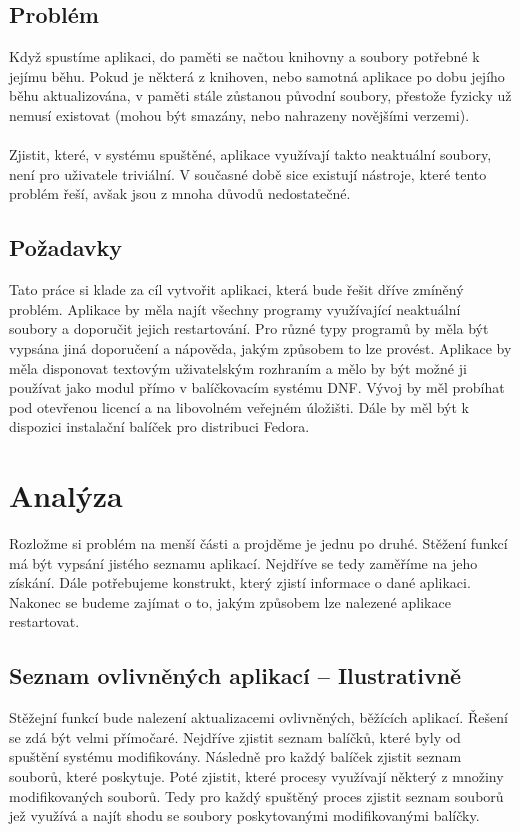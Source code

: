 \documentclass[10pt,a4paper]{article}
\begin{document}
		\subsection{Problém}
		Když spustíme aplikaci, do paměti se načtou knihovny a soubory potřebné k jejímu běhu. Pokud je některá z knihoven, nebo samotná aplikace po dobu jejího běhu aktualizována, v paměti stále zůstanou původní soubory, přestože fyzicky už nemusí existovat (mohou být smazány, nebo nahrazeny novějšími verzemi).
		\\\\
		Zjistit, které, v systému spuštěné, aplikace využívají takto neaktuální soubory, není pro uživatele triviální. V současné době sice existují nástroje, které tento problém řeší, avšak jsou z mnoha důvodů nedostatečné.

		\subsection{Požadavky}
		Tato práce si klade za cíl vytvořit aplikaci, která bude řešit dříve zmíněný problém. Aplikace by měla najít všechny programy využívající neaktuální soubory a doporučit jejich restartování. Pro různé typy programů by měla být vypsána jiná doporučení a nápověda, jakým způsobem to lze provést. Aplikace by měla disponovat textovým uživatelským rozhraním a mělo by být možné ji používat jako modul přímo v balíčkovacím systému DNF\@. Vývoj by měl probíhat pod otevřenou licencí a na libovolném veřejném úložišti. Dále by měl být k dispozici instalační balíček pro distribuci Fedora.

	\section{Analýza}
	Rozložme si problém na menší části a projděme je jednu po druhé. Stěžení funkcí má být vypsání jistého seznamu aplikací. Nejdříve se tedy zaměříme na jeho získání. Dále potřebujeme konstrukt, který zjistí informace o  dané aplikaci. Nakonec se budeme zajímat o to, jakým způsobem lze nalezené aplikace restartovat.

		\subsection{Seznam ovlivněných aplikací -- Ilustrativně}
		Stěžejní funkcí bude nalezení aktualizacemi ovlivněných, běžících aplikací. Řešení se zdá být velmi přímočaré. Nejdříve zjistit seznam balíčků, které byly od spuštění systému modifikovány. Následně pro každý balíček zjistit seznam souborů, které poskytuje. Poté zjistit, které procesy využívají některý z množiny modifikovaných souborů. Tedy pro každý spuštěný proces zjistit seznam souborů jež využívá a najít shodu se soubory poskytovanými modifikovanými balíčky.
\end{document}
